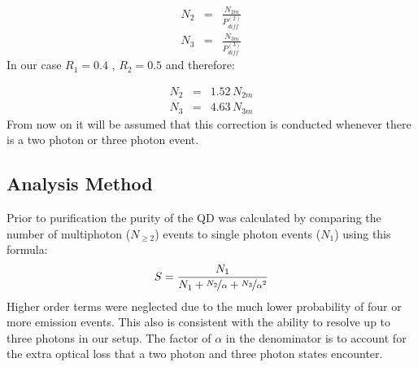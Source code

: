 \documentclass[reprint,onecolumn]{revtex4-1}
\begin{document}
\begin{eqnarray*}
N_{2} & = & \frac{N_{2m}}{P_{diff}^{(2)}}\\
N_{3} & = & \frac{N_{3m}}{P_{diff}^{(3)}}
\end{eqnarray*}
In our case $R_{1}=0.4$ , $R_{2}=0.5$ and therefore:

\begin{eqnarray*}
N_{2} & = & 1.52\,N_{2m}\\
N_{3} & = & 4.63\,N_{3m}
\end{eqnarray*}
From now on it will be assumed that this correction is conducted whenever
there is a two photon or three photon event. 

\subsection{Analysis Method}



Prior to purification the purity of the QD was calculated by comparing the number of multiphoton ($N_{\ge2}$) events to single photon events ($N_{1}$) using this formula:  
$$S= \frac{N_1}{N_1+\nicefrac{N_{2}}{\alpha}+\nicefrac{N_{3}}{\alpha^2}} $$
Higher order terms were neglected due to the much lower probability of four or more emission events. This also is consistent with the ability to resolve up to three photons in our setup.   
The factor of $\alpha$ in the denominator is to account for the extra optical loss that a two photon and three photon states encounter. 
\end{document}
